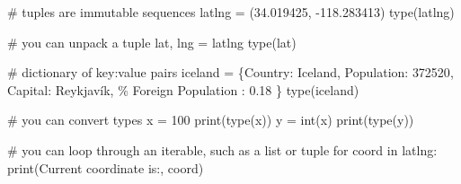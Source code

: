 \documentclass[
  letterpaper,
  DIV=11,
  numbers=noendperiod]{scrreprt}
\newenvironment{Shaded}{\begin{snugshade}}{\end{snugshade}}
\newcommand{\BuiltInTok}[1]{\textcolor[rgb]{0.00,0.23,0.31}{#1}}
\newcommand{\CommentTok}[1]{\textcolor[rgb]{0.37,0.37,0.37}{#1}}
\newcommand{\ControlFlowTok}[1]{\textcolor[rgb]{0.00,0.23,0.31}{#1}}
\newcommand{\DecValTok}[1]{\textcolor[rgb]{0.68,0.00,0.00}{#1}}
\newcommand{\FloatTok}[1]{\textcolor[rgb]{0.68,0.00,0.00}{#1}}
\newcommand{\KeywordTok}[1]{\textcolor[rgb]{0.00,0.23,0.31}{#1}}
\newcommand{\NormalTok}[1]{\textcolor[rgb]{0.00,0.23,0.31}{#1}}
\newcommand{\OperatorTok}[1]{\textcolor[rgb]{0.37,0.37,0.37}{#1}}
\newcommand{\SpecialCharTok}[1]{\textcolor[rgb]{0.37,0.37,0.37}{#1}}
\newcommand{\StringTok}[1]{\textcolor[rgb]{0.13,0.47,0.30}{#1}}
\begin{document}
\begin{Shaded}
\begin{Highlighting}[]
\CommentTok{\# tuples are immutable sequences}
\NormalTok{latlng }\OperatorTok{=}\NormalTok{ (}\FloatTok{34.019425}\NormalTok{, }\OperatorTok{{-}}\FloatTok{118.283413}\NormalTok{)}
\BuiltInTok{type}\NormalTok{(latlng)}
\end{Highlighting}
\end{Shaded}

\begin{Shaded}
\begin{Highlighting}[]
\CommentTok{\# you can unpack a tuple}
\NormalTok{lat, lng }\OperatorTok{=}\NormalTok{ latlng}
\BuiltInTok{type}\NormalTok{(lat)}
\end{Highlighting}
\end{Shaded}

\begin{Shaded}
\begin{Highlighting}[]
\CommentTok{\# dictionary of key:value pairs}
\NormalTok{iceland }\OperatorTok{=}\NormalTok{ \{}\StringTok{\textquotesingle{}Country\textquotesingle{}}\NormalTok{: }\StringTok{\textquotesingle{}Iceland\textquotesingle{}}\NormalTok{, }\StringTok{\textquotesingle{}Population\textquotesingle{}}\NormalTok{: }\DecValTok{372520}\NormalTok{, }\StringTok{\textquotesingle{}Capital\textquotesingle{}}\NormalTok{: }\StringTok{\textquotesingle{}Reykjavík\textquotesingle{}}\NormalTok{, }\StringTok{\textquotesingle{}}\SpecialCharTok{\% F}\StringTok{oreign Population\textquotesingle{}}\NormalTok{ : }\FloatTok{0.18}\NormalTok{ \}}
\BuiltInTok{type}\NormalTok{(iceland)}
\end{Highlighting}
\end{Shaded}

\begin{Shaded}
\begin{Highlighting}[]
\CommentTok{\# you can convert types}
\NormalTok{x }\OperatorTok{=} \StringTok{\textquotesingle{}100\textquotesingle{}}
\BuiltInTok{print}\NormalTok{(}\BuiltInTok{type}\NormalTok{(x))}
\NormalTok{y }\OperatorTok{=} \BuiltInTok{int}\NormalTok{(x)}
\BuiltInTok{print}\NormalTok{(}\BuiltInTok{type}\NormalTok{(y))}
\end{Highlighting}
\end{Shaded}

\begin{Shaded}
\begin{Highlighting}[]
\CommentTok{\# you can loop through an iterable, such as a list or tuple}
\ControlFlowTok{for}\NormalTok{ coord }\KeywordTok{in}\NormalTok{ latlng:}
    \BuiltInTok{print}\NormalTok{(}\StringTok{\textquotesingle{}Current coordinate is:\textquotesingle{}}\NormalTok{, coord)}
\end{Highlighting}
\end{Shaded}
\end{document}
